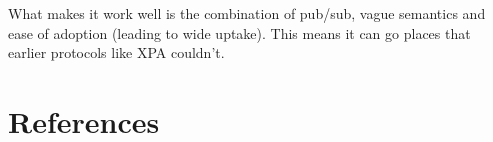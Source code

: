 \documentclass[5p]{elsarticle}
\newcommand{\todo}{\color{gray}}
\begin{document}
{\todo
What makes it work well is the combination of pub/sub, vague semantics
and ease of adoption (leading to wide uptake).  This means it can go
places that earlier protocols like XPA couldn't.
}
  

\section*{References}


\end{document}
